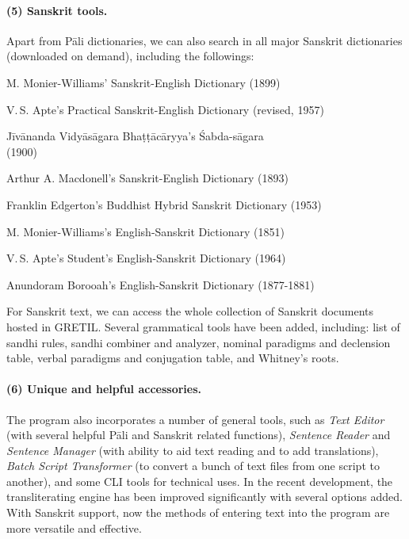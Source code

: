 \paragraph{(5) Sanskrit tools.} Apart from Pāli dictionaries, we can also search in all major Sanskrit dictionaries (downloaded on demand), including the followings:

\begin{compactitem}
\item M. Monier-Williams' Sanskrit-English Dictionary (1899)
\item V.\,S. Apte's Practical Sanskrit-English Dictionary (revised, 1957)
\item Jīvānanda Vidyāsāgara Bhaṭṭācāryya's Śabda-sāgara \\(1900)
\item Arthur A. Macdonell's Sanskrit-English Dictionary (1893)
\item Franklin Edgerton's Buddhist Hybrid Sanskrit Dictionary (1953)
\item M. Monier-Williams's English-Sanskrit Dictionary (1851)
\item V.\,S. Apte's Student's English-Sanskrit Dictionary (1964)
\item Anundoram Borooah's English-Sanskrit Dictionary (1877-1881)
\end{compactitem}

For Sanskrit text, we can access the whole collection of Sanskrit documents hosted in GRETIL. Several grammatical tools have been added, including: list of sandhi rules, sandhi combiner and analyzer, nominal paradigms and declension table, verbal paradigms and conjugation table, and Whitney's roots.

\paragraph{(6) Unique and helpful accessories.} The program also incorporates a number of general tools, such as \emph{Text Editor} (with several helpful Pāli and Sanskrit related functions), \emph{Sentence Reader} and \emph{Sentence Manager} (with ability to aid text reading and to add translations), \emph{Batch Script Transformer} (to convert a bunch of text files from one script to another), and some CLI tools for technical uses. In the recent development, the transliterating engine has been improved significantly with several options added. With Sanskrit support, now the methods of entering text into the program are more versatile and effective.

